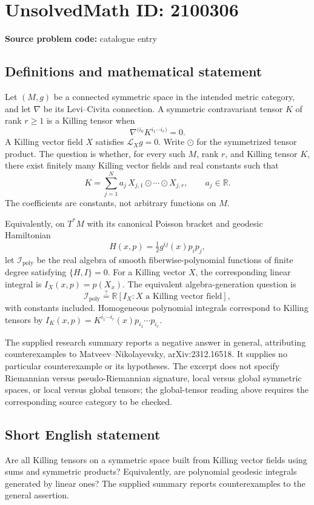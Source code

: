 \documentclass[11pt]{article}
\newcommand{\R}{\mathbb{R}}
\begin{document}
\section*{UnsolvedMath ID: 2100306}
\textbf{Source problem code:} catalogue entry
\subsection{Definitions and mathematical statement}
Let \((M,g)\) be a connected symmetric space in the intended metric category, and let \(\nabla\) be its Levi--Civita connection. A symmetric contravariant tensor \(K\) of rank \(r\ge1\) is a Killing tensor when
\[
\nabla^{(i_0}K^{i_1\cdots i_r)}=0.
\]
A Killing vector field \(X\) satisfies \(\mathcal L_Xg=0\). Write \(\odot\) for the symmetrized tensor product. The question is whether, for every such \(M\), rank \(r\), and Killing tensor \(K\), there exist finitely many Killing vector fields and real constants such that
\[
K=\sum_{j=1}^N a_j\,
X_{j,1}\odot\cdots\odot X_{j,r},\qquad a_j\in\R.
\]
The coefficients are constants, not arbitrary functions on \(M\).

Equivalently, on \(T^*M\) with its canonical Poisson bracket and geodesic Hamiltonian
\[
H(x,p)=\tfrac12 g^{ij}(x)p_ip_j,
\]
let \(\mathcal I_{\mathrm{poly}}\) be the real algebra of smooth fiberwise-polynomial functions of finite degree satisfying \(\{H,I\}=0\). For a Killing vector \(X\), the corresponding linear integral is \(I_X(x,p)=p(X_x)\). The equivalent algebra-generation question is
\[
\mathcal I_{\mathrm{poly}}\stackrel{?}{=}\R[I_X:X\text{ a Killing vector field}],
\]
with constants included. Homogeneous polynomial integrals correspond to Killing tensors by \(I_K(x,p)=K^{i_1\cdots i_r}(x)p_{i_1}\cdots p_{i_r}\).

The supplied research summary reports a negative answer in general, attributing counterexamples to Matveev--Nikolayevsky, arXiv:2312.16518. It supplies no particular counterexample or its hypotheses. The excerpt does not specify Riemannian versus pseudo-Riemannian signature, local versus global symmetric spaces, or local versus global tensors; the global-tensor reading above requires the corresponding source category to be checked.
\subsection{Short English statement}
Are all Killing tensors on a symmetric space built from Killing vector fields using sums and symmetric products? Equivalently, are polynomial geodesic integrals generated by linear ones? The supplied summary reports counterexamples to the general assertion.
\end{document}
